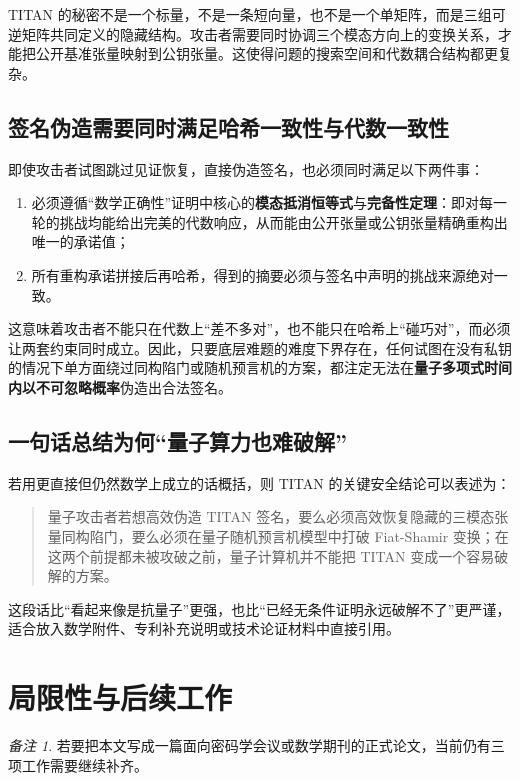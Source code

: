 \documentclass[12pt,a4paper]{article}
\theoremstyle{remark}
\newtheorem{remark}{备注}[section]
\begin{document}
TITAN 的秘密不是一个标量，不是一条短向量，也不是一个单矩阵，而是三组可逆矩阵共同定义的隐藏结构。攻击者需要同时协调三个模态方向上的变换关系，才能把公开基准张量映射到公钥张量。这使得问题的搜索空间和代数耦合结构都更复杂。

\subsection{签名伪造需要同时满足哈希一致性与代数一致性}

即使攻击者试图跳过见证恢复，直接伪造签名，也必须同时满足以下两件事：
\begin{enumerate}
    \item 必须遵循“数学正确性”证明中核心的\textbf{模态抵消恒等式}与\textbf{完备性定理}：即对每一轮的挑战均能给出完美的代数响应，从而能由公开张量或公钥张量精确重构出唯一的承诺值；
    \item 所有重构承诺拼接后再哈希，得到的摘要必须与签名中声明的挑战来源绝对一致。
\end{enumerate}

这意味着攻击者不能只在代数上“差不多对”，也不能只在哈希上“碰巧对”，而必须让两套约束同时成立。因此，只要底层难题的难度下界存在，任何试图在没有私钥的情况下单方面绕过同构陷门或随机预言机的方案，都注定无法在\textbf{量子多项式时间内以不可忽略概率}伪造出合法签名。

\subsection{一句话总结为何“量子算力也难破解”}

若用更直接但仍然数学上成立的话概括，则 TITAN 的关键安全结论可以表述为：
\begin{quote}
量子攻击者若想高效伪造 TITAN 签名，要么必须高效恢复隐藏的三模态张量同构陷门，要么必须在量子随机预言机模型中打破 Fiat-Shamir 变换；在这两个前提都未被攻破之前，量子计算机并不能把 TITAN 变成一个容易破解的方案。
\end{quote}

这段话比“看起来像是抗量子”更强，也比“已经无条件证明永远破解不了”更严谨，适合放入数学附件、专利补充说明或技术论证材料中直接引用。

\section{局限性与后续工作}

\begin{remark}
若要把本文写成一篇面向密码学会议或数学期刊的正式论文，当前仍有三项工作需要继续补齐。
\end{remark}
\end{document}
